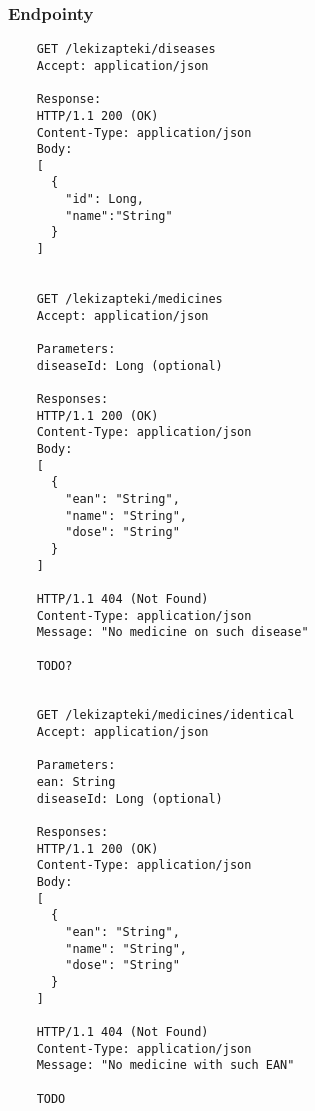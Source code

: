 \documentclass{article}
\begin{document}
  \subsubsection{Endpointy}
  \begin{lstlisting}
    GET /lekizapteki/diseases
    Accept: application/json

    Response:
    HTTP/1.1 200 (OK)
    Content-Type: application/json
    Body:
    [
      {
        "id": Long,
        "name":"String"
      }
    ]


    GET /lekizapteki/medicines
    Accept: application/json

    Parameters:
    diseaseId: Long (optional)

    Responses:
    HTTP/1.1 200 (OK)
    Content-Type: application/json
    Body:
    [
      {
        "ean": "String",
        "name": "String",
        "dose": "String"
      }
    ]

    HTTP/1.1 404 (Not Found)
    Content-Type: application/json
    Message: "No medicine on such disease"

    TODO?


    GET /lekizapteki/medicines/identical
    Accept: application/json

    Parameters:
    ean: String
    diseaseId: Long (optional)

    Responses:
    HTTP/1.1 200 (OK)
    Content-Type: application/json
    Body:
    [
      {
        "ean": "String",
        "name": "String",
        "dose": "String"
      }
    ]

    HTTP/1.1 404 (Not Found)
    Content-Type: application/json
    Message: "No medicine with such EAN"

    TODO

  \end{lstlisting}
\end{document}
